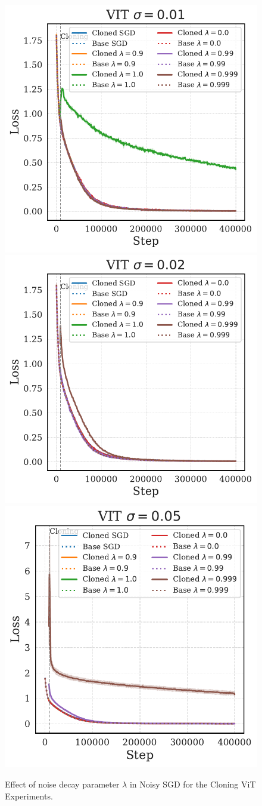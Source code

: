 \documentclass{article}
\numberwithin{figure}{section}
\begin{document}
\begin{figure}
    \centering
    \includegraphics[width=0.3\linewidth]{paper/images/vit_noises_cloning_losses_plot_lamda_sigma_0.01.pdf}
    \includegraphics[width=0.3\linewidth]{paper/images/vit_noises_cloning_losses_plot_lamda_sigma_0.02.pdf}
    \includegraphics[width=0.3\linewidth]{paper/images/vit_noises_cloning_losses_plot_lamda_sigma_0.05.pdf}
    \caption{Effect of noise decay parameter $\lambda$ in Noisy SGD for the Cloning ViT Experiments.}
    \label{fig:noise-decay-vit}
\end{figure}
\end{document}
